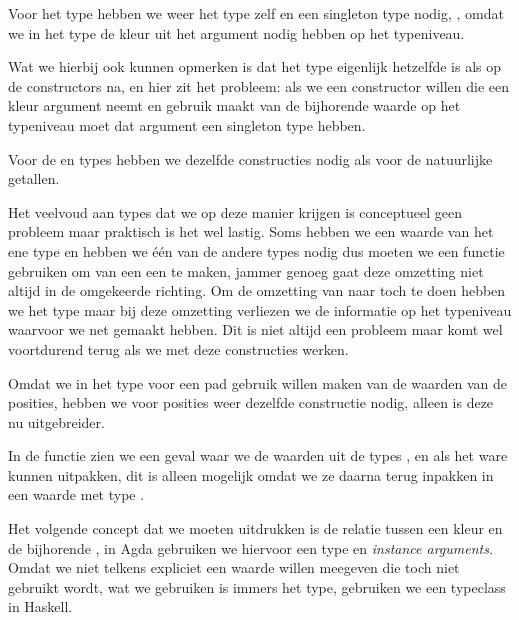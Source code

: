 Voor het  type hebben we weer het type zelf en een singleton type
nodig, , omdat we in het  type de kleur uit
het argument nodig hebben op het typeniveau.


Wat we hierbij ook kunnen opmerken is dat het type 
eigenlijk hetzelfde is als  op de constructors na, en hier zit
het probleem: als we een constructor willen die een kleur argument neemt en
gebruik maakt van de bijhorende waarde op het typeniveau moet dat argument een
singleton type hebben.

Voor de  en  types hebben we dezelfde
constructies nodig als voor de natuurlijke getallen.


Het veelvoud aan types dat we op deze manier krijgen is conceptueel geen
probleem maar praktisch is het wel lastig. Soms hebben we een waarde van het
ene type en hebben we één van de andere types nodig dus moeten we een functie
gebruiken om van een  een  te maken, jammer genoeg
gaat deze omzetting niet altijd in de omgekeerde richting. Om de omzetting van
 naar  toch te doen hebben we het type
 maar bij deze omzetting verliezen we de informatie op het
typeniveau waarvoor we  net gemaakt hebben. Dit is niet altijd een
probleem maar komt wel voortdurend terug als we met deze constructies werken.

Omdat we in het type voor een pad gebruik willen maken van de waarden van de
posities, hebben we voor posities weer dezelfde constructie nodig, alleen is
deze nu uitgebreider.


In de functie  zien we een geval waar
we de waarden uit de types ,  en   als
het ware kunnen uitpakken, dit is alleen mogelijk omdat we ze daarna terug
inpakken in een waarde met type .

Het volgende concept dat we moeten uitdrukken is de relatie tussen een kleur en
de bijhorende , in Agda gebruiken we hiervoor een type en
\emph{instance arguments}. Omdat we niet telkens expliciet een waarde willen
meegeven die toch niet gebruikt wordt, wat we gebruiken is immers het type,
gebruiken we een typeclass in Haskell.

